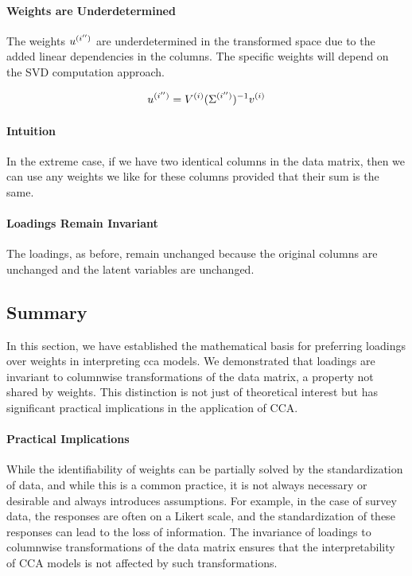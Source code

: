 \paragraph{Weights are Underdetermined}
The weights \( u^{(i'')} \) are underdetermined in the transformed space due to the added linear dependencies in the columns. The specific weights will depend on the SVD computation approach.

\begin{align}
    u^{(i'')} = V^{(i)}(\Sigma^{(i'')})^{-1}v^{(i)} \label{eq:weights_change}
\end{align}

\paragraph{Intuition}
In the extreme case, if we have two identical columns in the data matrix, then we can use any weights we like for these columns provided that their sum is the same.

\paragraph{Loadings Remain Invariant}
The loadings, as before, remain unchanged because the original columns are unchanged and the latent variables are unchanged.

\subsection{Summary}

In this section, we have established the mathematical basis for preferring \gls{loadings} over weights in interpreting \acrshort{cca} models. We demonstrated that \gls{loadings} are invariant to columnwise transformations of the data matrix, a property not shared by weights. This distinction is not just of theoretical interest but has significant practical implications in the application of CCA.

\paragraph{Practical Implications}

While the identifiability of weights can be partially solved by the standardization of data, and while this is a common practice, it is not always necessary or desirable and always introduces assumptions. For example, in the case of survey data, the responses are often on a Likert scale, and the standardization of these responses can lead to the loss of information. The invariance of \gls{loadings} to columnwise transformations of the data matrix ensures that the interpretability of CCA models is not affected by such transformations.

